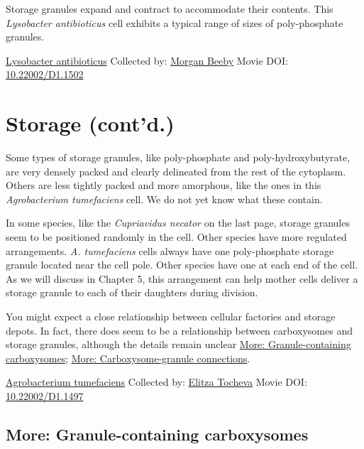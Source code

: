 \documentclass[]{tufte-book}
\begin{document}
Storage granules expand and contract to accommodate their contents. This \emph{Lysobacter antibioticus} cell exhibits a typical range of sizes of poly-phosphate granules.



\hypertarget{htmlwidget-fa24ced7bd007f604a24}{}

\label{fig:4-8a}\protect\hyperlink{tree}{Lysobacter antibioticus} Collected by: \protect\hyperlink{morgan_beeby}{Morgan Beeby} Movie DOI: \href{https://doi.org/10.22002/D1.1502}{10.22002/D1.1502}

\hypertarget{storage-contd.}{%
\section{Storage (cont'd.)}\label{storage-contd.}}

Some types of storage granules, like poly-phosphate and poly-hydroxybutyrate, are very densely packed and clearly delineated from the rest of the cytoplasm. Others are less tightly packed and more amorphous, like the ones in this \emph{Agrobacterium tumefaciens} cell. We do not yet know what these contain.

In some species, like the \emph{Cupriavidus necator} on the last page, storage granules seem to be positioned randomly in the cell. Other species have more regulated arrangements. \emph{A. tumefaciens} cells always have one poly-phosphate storage granule located near the cell pole. Other species have one at each end of the cell. As we will discuss in Chapter 5, this arrangement can help mother cells deliver a storage granule to each of their daughters during division.

You might expect a close relationship between cellular factories and storage depots. In fact, there does seem to be a relationship between carboxysomes and storage granules, although the details remain unclear \protect\hyperlink{Granule-containing_carboxysomes}{More: Granule-containing carboxysomes}; \protect\hyperlink{Carboxysome-granule_connections}{More: Carboxysome-granule connections}.



\hypertarget{htmlwidget-355dd375446a8621426e}{}

\label{fig:4-9}\protect\hyperlink{tree}{Agrobacterium tumefaciens} Collected by: \protect\hyperlink{elitza_tocheva}{Elitza Tocheva} Movie DOI: \href{https://doi.org/10.22002/D1.1497}{10.22002/D1.1497}

\hypertarget{Granule-containing_carboxysomes}{%
\subsection*{More: Granule-containing carboxysomes}\label{Granule-containing_carboxysomes}}
\end{document}
